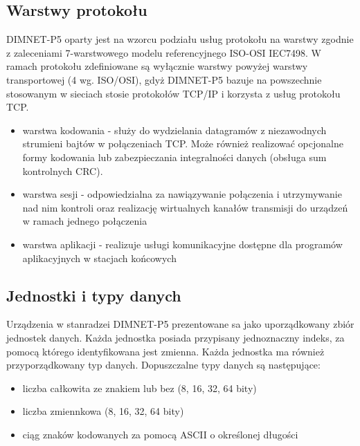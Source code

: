 \subsection{Warstwy protokołu}
DIMNET-P5 oparty jest na wzorcu podziału usług protokołu na warstwy zgodnie z zaleceniami 7-warstwowego modelu referencyjnego ISO-OSI IEC7498. W ramach protokołu zdefiniowane są wyłącznie warstwy powyżej warstwy transportowej (4 wg. ISO/OSI), gdyż DIMNET-P5 bazuje na powszechnie stosowanym w sieciach stosie protokołów TCP/IP i korzysta z usług protokołu TCP. 
\begin{itemize}
\item warstwa kodowania - służy do wydzielania datagramów z niezawodnych strumieni bajtów w połączeniach TCP. Może również realizować opcjonalne formy kodowania lub zabezpieczania integralności danych (obsługa sum kontrolnych CRC).
\item warstwa sesji - odpowiedzialna za nawiązywanie połączenia i utrzymywanie nad nim kontroli oraz realizację wirtualnych kanałów transmisji do urządzeń w ramach jednego połączenia
\item warstwa aplikacji - realizuje usługi komunikacyjne dostępne dla programów aplikacyjnych w stacjach końcowych
\end{itemize}

\subsection{Jednostki i typy danych}
Urządzenia w stanradzei DIMNET-P5 prezentowane sa jako uporządkowany zbiór jednostek danych. Każda jednostka posiada przypisany jednoznaczny indeks, za pomocą którego identyfikowana jest zmienna. Każda jednostka ma również przyporządkowany typ danych. Dopuszczalne typy danych są następujące:
\begin{itemize}
\item liczba całkowita ze znakiem lub bez (8, 16, 32, 64 bity)
\item liczba zmiennkowa (8, 16, 32, 64 bity)
\item ciąg znaków kodowanych za pomocą ASCII o określonej długości
\end{itemize}

